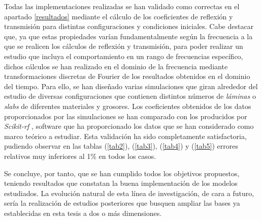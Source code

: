 \documentclass[11pt,a4paper,twoside,pdf]{article}
\numberwithin{equation}{section}
\begin{document}
Todas las implementaciones realizadas se han validado como correctas en el apartado \ref{resultados} mediante el cálculo de los coeficientes de reflexión y transmisión para distintas configuraciones y condiciones iniciales. Cabe destacar que, ya que estas propiedades varían fundamentalmente según la frecuencia a la que se realicen los cálculos de reflexión y transmisión, para poder realizar un estudio que incluya  el comportamiento en un rango de frecuencias específico, dichos cálculos se han realizado en el dominio de la frecuencia mediante transformaciones discretas de Fourier de los resultados obtenidos en el dominio del tiempo. Para ello, se han diseñado varias simulaciones que giran alrededor del estudio de diversas configuraciones que contienen distintos números de \textit{láminas} o \textit{slabs} de diferentes materiales y grosores. Los coeficientes obtenidos de los datos proporcionados por las simulaciones se han comparado con los producidos por \textit{Scikit-rf} \cite{scikit}, software que ha proporcionado los datos que se han considerado como marco teórico a estudiar. Esta validación ha sido completamente satisfactoria, pudiendo observar en las tablas (\ref{tab2}), (\ref{tab3}), (\ref{tab4}) y (\ref{tab5}) errores relativos muy inferiores al 1$\%$ en todos los casos.

Se concluye, por tanto, que se han cumplido todos los objetivos propuestos, teniendo resultados que constatan la buena implementación de los modelos estudiados. La evolución natural de esta línea de investigación, de cara a futuro, sería la realización de estudios posteriores que busquen ampliar las bases ya establecidas en esta tesis a dos o más dimensiones.

\newpage

\end{document}
